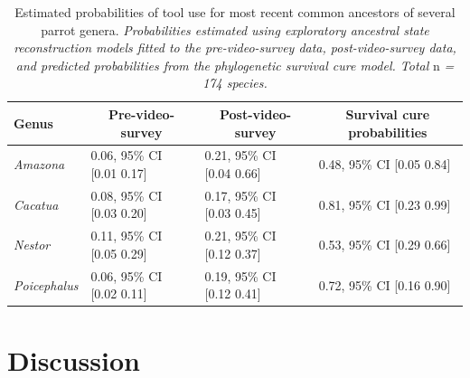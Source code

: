 \documentclass[
  man,floatsintext]{apa6}
\begin{document}
\begin{table}[tbp]

\begin{center}
\begin{threeparttable}

\caption{\label{tab:tableASR}Estimated probabilities of tool use for most recent common
ancestors of several parrot genera. \emph{Probabilities estimated using exploratory
ancestral state reconstruction models fitted to the pre-video-survey data,
post-video-survey data, and predicted probabilities from the phylogenetic
survival cure model. Total} n \emph{= 174 species.}}

\begin{tabular}{llll}
\toprule
Genus & \multicolumn{1}{c}{Pre-video-survey} & \multicolumn{1}{c}{Post-video-survey} & \multicolumn{1}{c}{Survival cure probabilities}\\
\midrule
\textit{Amazona} & 0.06, 95\% CI [0.01 0.17] & 0.21, 95\% CI [0.04 0.66] & 0.48, 95\% CI [0.05 0.84]\\
\textit{Cacatua} & 0.08, 95\% CI [0.03 0.20] & 0.17, 95\% CI [0.03 0.45] & 0.81, 95\% CI [0.23 0.99]\\
\textit{Nestor} & 0.11, 95\% CI [0.05 0.29] & 0.21, 95\% CI [0.12 0.37] & 0.53, 95\% CI [0.29 0.66]\\
\textit{Poicephalus} & 0.06, 95\% CI [0.02 0.11] & 0.19, 95\% CI [0.12 0.41] & 0.72, 95\% CI [0.16 0.90]\\
\bottomrule
\end{tabular}

\end{threeparttable}
\end{center}

\end{table}

\hypertarget{discussion}{%
\section{Discussion}\label{discussion}}
\end{document}
